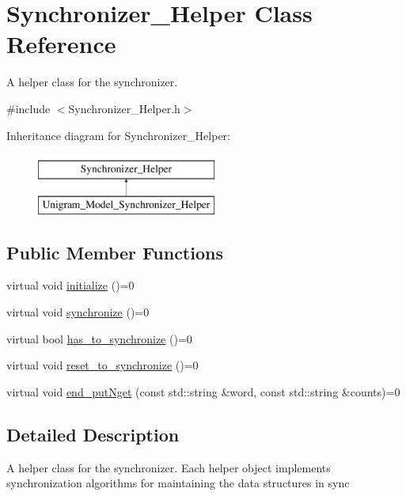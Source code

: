 \hypertarget{class_synchronizer___helper}{
\section{Synchronizer\_\-Helper Class Reference}
\label{class_synchronizer___helper}
}


A helper class for the synchronizer.  




{\ttfamily \#include $<$Synchronizer\_\-Helper.h$>$}

Inheritance diagram for Synchronizer\_\-Helper:\begin{figure}[H]
\begin{center}
\leavevmode
\includegraphics[height=2cm]{class_synchronizer___helper}
\end{center}
\end{figure}
\subsection*{Public Member Functions}
\begin{DoxyCompactItemize}
\item 
virtual void \hyperlink{class_synchronizer___helper_a7732654b0b1f02ba661e520564a690b8}{initialize} ()=0
\item 
virtual void \hyperlink{class_synchronizer___helper_a18aca854fe152f99640556a2a4e04f96}{synchronize} ()=0
\item 
virtual bool \hyperlink{class_synchronizer___helper_a1d9c38f95c9a3a517e5a89659aa4c522}{has\_\-to\_\-synchronize} ()=0
\item 
virtual void \hyperlink{class_synchronizer___helper_ac58a4f287d5edd1fa6883701567da75a}{reset\_\-to\_\-synchronize} ()=0
\item 
virtual void \hyperlink{class_synchronizer___helper_a29ac0b4b630f56e59e6587bb6275d97e}{end\_\-putNget} (const std::string \&word, const std::string \&counts)=0
\end{DoxyCompactItemize}


\subsection{Detailed Description}
A helper class for the synchronizer. Each helper object implements synchronization algorithms for maintaining the data structures in sync

